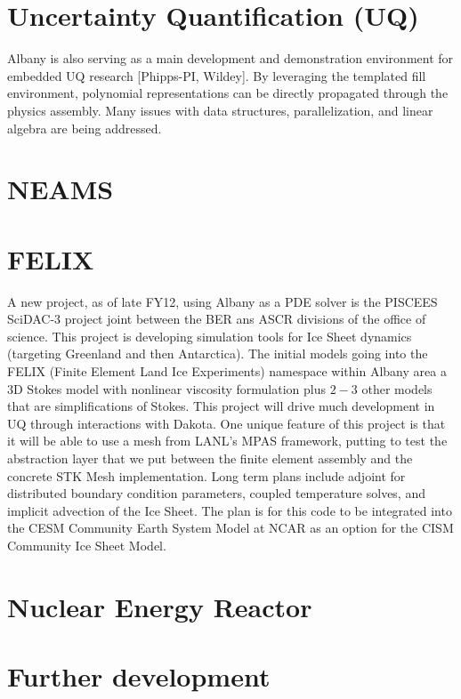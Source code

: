 \documentclass[pdf,12pt,report,strict]{SANDreport}
\theoremstyle{remark}
\begin{document}
\section {Uncertainty Quantification (UQ)}
Albany is also serving as a main development and demonstration
environment for embedded UQ research [Phipps-PI, Wildey]. By
leveraging the templated fill environment, polynomial representations
can be directly propagated through the physics assembly. Many issues
with data structures, parallelization, and linear algebra are being
addressed.  

\section{NEAMS}

\section{FELIX}
A new project, as of late FY12, using Albany as a PDE solver is the PISCEES SciDAC-3 project
joint between the BER ans ASCR divisions of the office of science. This
project is developing simulation tools for Ice Sheet dynamics (targeting
Greenland and then Antarctica). The initial models going into the FELIX
(Finite Element Land Ice Experiments) namespace within Albany area
a 3D Stokes model with nonlinear viscosity
formulation plus $2-3$ other models that are simplifications of Stokes.
This project will drive much development in UQ through interactions 
with Dakota. One unique feature of this project is that it will be able
to use a mesh from LANL's MPAS framework, putting to test the abstraction
layer that we put between the finite element assembly and the concrete
STK Mesh implementation. Long term plans include adjoint for distributed
boundary condition parameters, coupled temperature solves, and implicit
advection of the Ice Sheet. The plan is for this code to be integrated
into the CESM Community Earth System Model at NCAR as an option for the
CISM Community Ice Sheet Model.

\section{Nuclear Energy Reactor}

\section{Further development}
\end{document}
